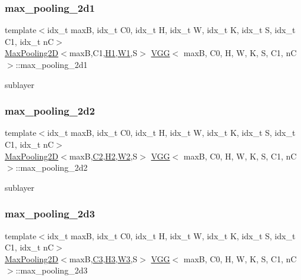 \subsubsection{\texorpdfstring{max\+\_\+pooling\+\_\+2d1}{max\_pooling\_2d1}}
{\footnotesize\ttfamily template$<$idx\+\_\+t maxB, idx\+\_\+t C0, idx\+\_\+t H, idx\+\_\+t W, idx\+\_\+t K, idx\+\_\+t S, idx\+\_\+t C1, idx\+\_\+t nC$>$ \\
\hyperlink{structMaxPooling2D}{Max\+Pooling2D}$<$maxB,C1,\hyperlink{structVGG_a73f189c70eef33b8e8de32929db37b10}{H1},\hyperlink{structVGG_a01305ab6d90c95eb50c45352203b07e0}{W1},S$>$ \hyperlink{structVGG}{V\+GG}$<$ maxB, C0, H, W, K, S, C1, nC $>$\+::max\+\_\+pooling\+\_\+2d1}

sublayer \mbox{\label{structVGG_a2f4ff4efd026307976663ba43dd678c9}} 
\subsubsection{\texorpdfstring{max\+\_\+pooling\+\_\+2d2}{max\_pooling\_2d2}}
{\footnotesize\ttfamily template$<$idx\+\_\+t maxB, idx\+\_\+t C0, idx\+\_\+t H, idx\+\_\+t W, idx\+\_\+t K, idx\+\_\+t S, idx\+\_\+t C1, idx\+\_\+t nC$>$ \\
\hyperlink{structMaxPooling2D}{Max\+Pooling2D}$<$maxB,\hyperlink{structVGG_a1e9ad0d15e42696798d44b06ad3c9a9a}{C2},\hyperlink{structVGG_a6658da7d5fd275b2af6eb75511ba6f80}{H2},\hyperlink{structVGG_ac4a4d00b5e2ee41b1d4e8861bbc6c499}{W2},S$>$ \hyperlink{structVGG}{V\+GG}$<$ maxB, C0, H, W, K, S, C1, nC $>$\+::max\+\_\+pooling\+\_\+2d2}

sublayer \mbox{\label{structVGG_a0c29593e7a4726099dc2b982534df479}} 
\subsubsection{\texorpdfstring{max\+\_\+pooling\+\_\+2d3}{max\_pooling\_2d3}}
{\footnotesize\ttfamily template$<$idx\+\_\+t maxB, idx\+\_\+t C0, idx\+\_\+t H, idx\+\_\+t W, idx\+\_\+t K, idx\+\_\+t S, idx\+\_\+t C1, idx\+\_\+t nC$>$ \\
\hyperlink{structMaxPooling2D}{Max\+Pooling2D}$<$maxB,\hyperlink{structVGG_a88a35c950ca73035ad75644925c05061}{C3},\hyperlink{structVGG_aad221438514d3b1a829d7f9c27a6f5ea}{H3},\hyperlink{structVGG_ad3bde49e961175621e0937584dae0af0}{W3},S$>$ \hyperlink{structVGG}{V\+GG}$<$ maxB, C0, H, W, K, S, C1, nC $>$\+::max\+\_\+pooling\+\_\+2d3}

